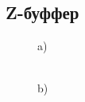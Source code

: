 \documentclass[14pt,a4paper,report]{report}
\begin{document}
\clearpage
\subsection{Z-буффер}



\begin{figure}[h!]
\begin{minipage}[h]{0.47\linewidth}
 a) \\
\end{minipage}
\hfill
\begin{minipage}[h]{0.47\linewidth}
 \\b)

\end{minipage}
\end{figure}
\end{document}
